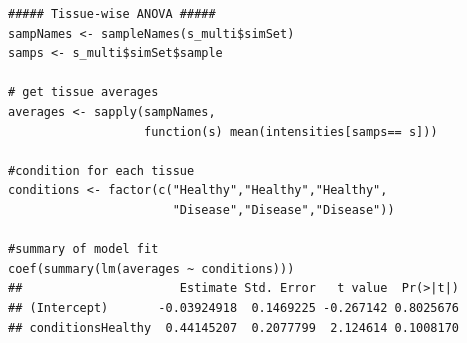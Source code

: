 \documentclass[a4paper]{article}\usepackage[]{graphicx}\usepackage[]{color}
\makeatletter
\newenvironment{kframe}{%
 \def\at@end@of@kframe{}%
 \ifinner\ifhmode%
  \def\at@end@of@kframe{\end{minipage}}%
  \begin{minipage}{\columnwidth}%
 \fi\fi%
 \def\FrameCommand##1{\hskip\@totalleftmargin \hskip-\fboxsep
 \colorbox{shadecolor}{##1}\hskip-\fboxsep
     \hskip-\linewidth \hskip-\@totalleftmargin \hskip\columnwidth}%
 \MakeFramed {\advance\hsize-\width
   \@totalleftmargin\z@ \linewidth\hsize
   \@setminipage}}%
 {\par\unskip\endMakeFramed%
 \at@end@of@kframe}
\newenvironment{knitrout}{}{} %
\makeatother
\begin{document}
\begin{knitrout}
\color{fgcolor}\begin{kframe}
\begin{verbatim}
##### Tissue-wise ANOVA #####
sampNames <- sampleNames(s_multi$simSet)
samps <- s_multi$simSet$sample 

# get tissue averages
averages <- sapply(sampNames, 
                   function(s) mean(intensities[samps== s]))

#condition for each tissue
conditions <- factor(c("Healthy","Healthy","Healthy",
                       "Disease","Disease","Disease"))

#summary of model fit
coef(summary(lm(averages ~ conditions))) 
##                      Estimate Std. Error   t value  Pr(>|t|)
## (Intercept)       -0.03924918  0.1469225 -0.267142 0.8025676
## conditionsHealthy  0.44145207  0.2077799  2.124614 0.1008170
\end{verbatim}
\end{kframe}
\end{knitrout}
\end{document}
